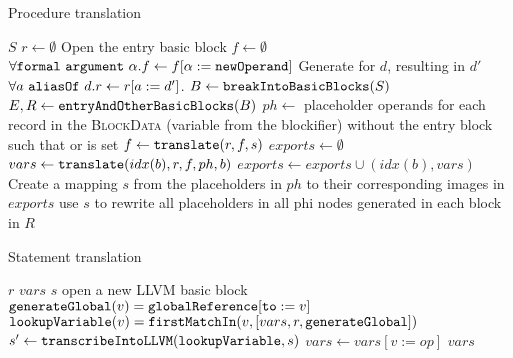 \begin{algorithm}[t]
    \caption{Procedure translation}
    \label{trans_proc}
    \begin{algorithmic}[1]
        \Require $S$ 
        \State $r \gets \emptyset$ 
        \State Open the entry basic block
        \State $f \gets \emptyset$ 
        \State $\forall \mathtt{formal\ argument}\ \alpha . f \gets f [ \alpha := \mathtt{newOperand}]$
            \State Generate  for $d$, resulting in $d'$
            \State $\forall  a\ \mathtt{aliasOf}\ d .  r \gets r[a := d']$. 
        \EndFor
        \State $B \gets \mathtt{breakIntoBasicBlocks} (S)$ 
        \State $E,R \gets \mathtt{entryAndOtherBasicBlocks}(B)$
        \State $ph \gets$ placeholder operands for each record in the \textsc{BlockData} (variable from the blockifier) without the entry block such that  or  is set
            \State $f \gets \mathtt{translate}(r, f, s)$ 
        \EndFor
        \State $exports \gets \emptyset$ 
            \State $vars \gets \mathtt{translate}(idx(b), r, f, ph, b)$ 
            \State $exports \gets exports \cup (idx(b),vars)$
        \EndFor
        \State Create a mapping $s$ from the placeholders in $ph$ to their corresponding images in $exports$
        \State use $s$ to rewrite all placeholders in all phi nodes generated in each block in $R$
    \end{algorithmic}
\end{algorithm}

\begin{algorithm}
    \caption{Statement translation}
    \label{transl_stmt}
    \begin{algorithmic}[1]
        \Require $r$ 
        \Require $vars$ 
        \Require $s$ 
            \State open a new LLVM basic block
        \Else
            \State $\mathtt{generateGlobal}(v) = \mathtt{globalReference} [\mathtt{to} := v]$
            \State $\mathtt{lookupVariable}(v) = \mathtt{firstMatchIn} (v, [vars, r, \mathtt{generateGlobal}])$
            \State $s' \gets \mathtt{transcribeIntoLLVM}(\mathtt{lookupVariable}, s)$
                \State $vars \gets vars [v := op]$ 
            \EndFor
        \EndIf
        \State \Return $vars$
    \end{algorithmic}
\end{algorithm}

